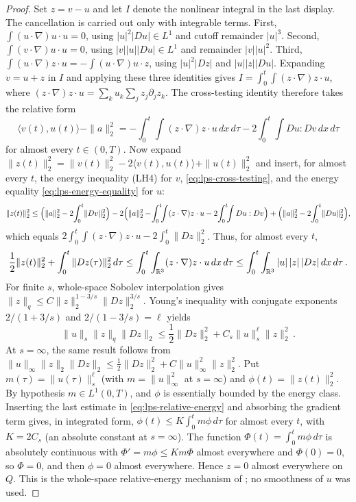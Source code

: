 \documentclass[11pt,letterpaper]{article}
\numberwithin{equation}{section}
\theoremstyle{plain}
\theoremstyle{definition}
\theoremstyle{remark}
\begin{document}
\begin{proof}
Set $z=v-u$ and let $I$ denote the nonlinear integral in the last display.
The cancellation is carried out only
with integrable terms. First,
$\int(u\cdot\nabla)u\cdot u=0$, using
$|u|^2|Du|\in L^1$ and cutoff remainder $|u|^3$.
Second, $\int(v\cdot\nabla)u\cdot u=0$, using
$|v||u||Du|\in L^1$ and remainder $|v||u|^2$.
Third, $\int(u\cdot\nabla)z\cdot u
=-\int(u\cdot\nabla)u\cdot z$, using
$|u|^2|Dz|$ and $|u||z||Du|$.
Expanding $v=u+z$ in $I$ and applying these three identities gives
$I=\int_0^t\!\int(z\cdot\nabla)z\cdot u$, where
$(z\cdot\nabla)z\cdot u=\sum_ku_k\sum_jz_j\partial_jz_k$. The cross-testing
identity therefore takes the relative form
\begin{equation}\label{eq:lps-cross-testing}
\langle v(t),u(t)\rangle-\|a\|_2^2
=-\int_0^t\!\int(z\cdot\nabla)z\cdot u\,dx\,d\tau
 -2\int_0^t\!\int Du:Dv\,dx\,d\tau
\end{equation}
for almost every $t\in(0,T)$.
Now expand $\|z(t)\|_2^2=\|v(t)\|_2^2-2\langle v(t),u(t)\rangle+\|u(t)\|_2^2$
and insert, for almost every $t$, the energy inequality (LH4) for $v$,
\eqref{eq:lps-cross-testing}, and the energy equality
\eqref{eq:lps-energy-equality} for $u$:
\[
\|z(t)\|_2^2\le
\Bigl(\|a\|_2^2-2\!\int_0^t\!\|Dv\|_2^2\Bigr)
-2\Bigl(\|a\|_2^2-\!\int_0^t\!\!\int(z\cdot\nabla)z\cdot u
-2\!\int_0^t\!\!\int Du:Dv\Bigr)
+\Bigl(\|a\|_2^2-2\!\int_0^t\!\|Du\|_2^2\Bigr),
\]
which equals
$2\int_0^t\!\int(z\cdot\nabla)z\cdot u-2\int_0^t\|Dz\|_2^2$. Thus, for
almost every $t$,
\begin{equation}\label{eq:lps-relative-energy}
\frac12\|z(t)\|_2^2+\int_{0}^{t}\|Dz(\tau)\|_2^2\,d\tau
\le\int_{0}^{t}\int_{\mathbb{R}^3}(z\cdot\nabla)z\cdot u\,dx\,d\tau
\le\int_{0}^{t}\int_{\mathbb{R}^3}|u|\,|z|\,|Dz|\,dx\,d\tau\,.
\end{equation}
For finite $s$, whole-space Sobolev interpolation gives
$\|z\|_q\le C\|z\|_2^{1-3/s}\|Dz\|_2^{3/s}$.
Young's inequality with conjugate exponents
$2/(1+3/s)$ and $2/(1-3/s)=\ell$ yields
\begin{equation}\label{eq:lps-relative-young}
\|u\|_s\|z\|_q\|Dz\|_2
\le\frac12\|Dz\|_2^2+C_s\|u\|_s^\ell\|z\|_2^2\,.
\end{equation}
At $s=\infty$, the same result follows from
$\|u\|_\infty\|z\|_2\|Dz\|_2
\le\frac12\|Dz\|_2^2+C\|u\|_\infty^2\|z\|_2^2$.
Put $m(\tau)=\|u(\tau)\|_s^\ell$ (with $m=\|u\|_\infty^2$ at $s=\infty$) and
$\phi(t)=\|z(t)\|_2^2$. By hypothesis $m\in L^1(0,T)$, and $\phi$ is
essentially bounded by the energy class. Inserting the last estimate in
\eqref{eq:lps-relative-energy} and absorbing the gradient term gives, in
integrated form, $\phi(t)\le K\int_0^tm\phi\,d\tau$ for almost every $t$,
with $K=2C_s$ (an absolute constant at $s=\infty$). The function
$\Phi(t)=\int_0^tm\phi\,d\tau$ is absolutely continuous with
$\Phi'=m\phi\le Km\Phi$ almost everywhere and $\Phi(0)=0$, so
$\Phi=0$, and then $\phi=0$ almost everywhere. Hence $z=0$ almost
everywhere on $Q$. This is the whole-space
relative-energy mechanism of
\cite[Theorem~8.19 and (8.12), printed p.~174]{RobinsonRodrigoSadowski2016};
no smoothness of $u$ was used.
\end{proof}
\end{document}
